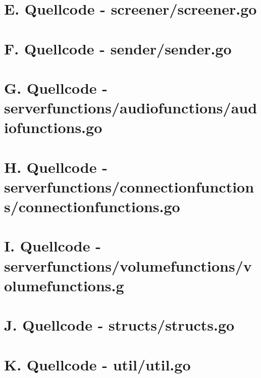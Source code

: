 \pagebreak

\section*{E. Quellcode - screener/screener.go}


\pagebreak

\section*{F. Quellcode - sender/sender.go}


\pagebreak

\section*{G. Quellcode - serverfunctions/audiofunctions/audiofunctions.go}


\pagebreak

\section*{H. Quellcode - serverfunctions/connectionfunctions/connectionfunctions.go}


\pagebreak

\section*{I. Quellcode - serverfunctions/volumefunctions/volumefunctions.g}


\pagebreak

\section*{J. Quellcode - structs/structs.go}


\pagebreak

\section*{K. Quellcode - util/util.go}
